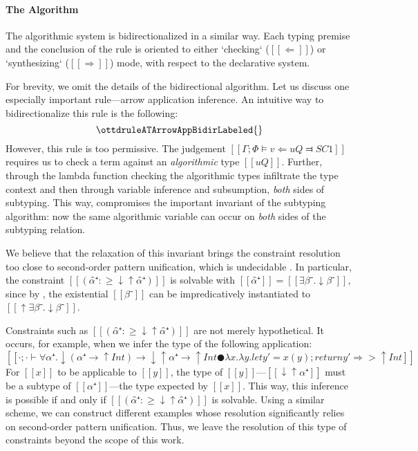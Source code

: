 \paragraph*{The Algorithm}

    The algorithmic system is bidirectionalized in a similar way. 
    Each typing premise and the conclusion of the rule is oriented
    to either `checking` ($[[⇐]]$) or `synthesizing` ($[[⇒]]$) mode,
    with respect to the declarative system. 
 
    For brevity, we omit the details of the bidirectional algorithm.
    Let us discuss one especially important rule---arrow application inference. 
    An intuitive way to bidirectionalize this rule is the following:
    $$ \ottdruleATArrowAppBidirLabeled{} $$
    However, this rule is too permissive. 
    The judgement $[[Γ ; Φ ⊨ v ⇐ uQ ⫤ SC1]]$
    requires us to check a term against an \emph{algorithmic} 
    type $[[uQ]]$. Further, through the
    lambda function checking 
    the algorithmic types infiltrate the type context
    and then through variable inference and subsumption, 
    \emph{both} sides of subtyping. 
    This way, 
    compromises the important invariant
    of the subtyping algorithm: 
    now the same algorithmic variable can occur on \emph{both}
     sides of the subtyping relation.

    We believe that the relaxation of this invariant brings the 
    constraint resolution too close to second-order pattern 
    unification, which is undecidable \cite{goldfarb81:undecidability}.
    In particular, the constraint $[[(α̂⁺ :≥ ↓↑α̂⁺)]]$ is solvable with 
    $[[α̂⁺]] = [[∃β⁻.↓β⁻]]$, 
    since by , 
    the existential $[[β⁻]]$ can be impredicatively instantiated to $[[↑∃β⁻.↓β⁻]]$. 

    Constraints such as $[[(α̂⁺ :≥ ↓↑α̂⁺)]]$ are not merely hypothetical. 
    It occurs, for example, when we infer the type of the following application:
    $$[[· ; · ⊢ ∀α⁺ . ↓(α⁺ → ↑Int) → ↓↑α⁺ → ↑Int ● {λx.λy.let y' = x(y); return y'} ⇒> ↑Int]]$$
    For $[[x]]$ to be applicable to $[[y]]$,
    the type of $[[y]]$---$[[↓↑α⁺]]$ must be a subtype of
    $[[α⁺]]$---the type expected by $[[x]]$. This way, 
    this inference is possible if and only if
    $[[(α̂⁺ :≥ ↓↑α̂⁺)]]$ is solvable.
    Using a similar scheme, we can construct different examples
    whose resolution significantly relies on second-order pattern unification.
    Thus, we leave the resolution of this type of constraints beyond the scope of this work.

